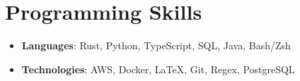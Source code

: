 \documentclass[letterpaper,11pt]{article}
\newcommand{\resumeSubHeadingListStart}{\begin{itemize}[leftmargin=*]}
\newcommand{\resumeSubHeadingListEnd}{\end{itemize}}
\begin{document}
\section{Programming Skills}
    \resumeSubHeadingListStart
        \item{
            \textbf{Languages}{: Rust, Python, TypeScript, SQL, Java, Bash/Zsh}
        }
        \vspace{-.3cm}
        \item{
            \textbf{Technologies}{: AWS, Docker, LaTeX, Git, Regex, PostgreSQL}
        }
    \resumeSubHeadingListEnd

\end{document}
